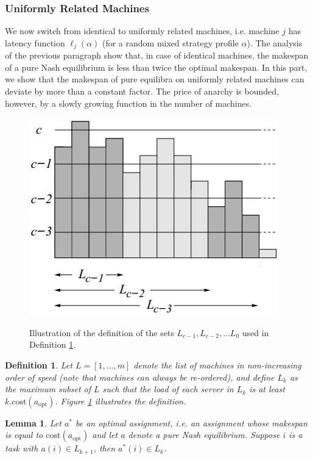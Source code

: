 \documentclass[a4paper,11pt]{article}
\newtheorem{lemma}[theorem]{Lemma}
\newtheorem{definition}[theorem]{Definition}
\newcommand{\cost}{\text{cost}}
\newcommand{\opt}{\text{opt}}
\newcommand{\copt}{\cost(a_{\opt})}
\begin{document}
\subsubsection{Uniformly Related Machines}
We now switch from identical to uniformly related machines, i.e. machine $j$ has latency function $\ell_j(\alpha)$ (for a random mixed strategy profile $\alpha$). The analysis of the previous paragraph show that, in case of identical machines, the makespan of a pure Nash equilibrium is less than twice the optimal makespan. In this part, we show that the makespan of pure equilibra on uniformly related machines can deviate by more than a constant factor. The price of anarchy is bounded, however, by a slowly growing function in the number of machines.


\begin{figure}[t]
  \centering
  \includegraphics[scale=0.5]{lk.jpg}\\
  \caption{Illustration of the definition of the sets $L_{c-1}, L_{c-2},...L_0$ used in Definition \ref{lkdef}.}\label{lk}
\end{figure}

\begin{definition}\cite{4}\label{lkdef}
Let $L = [1,...,m]$ denote the list of machines in non-increasing order of speed (note that machines can always be re-ordered), and define $L_k$ as the maximum subset of $L$ such that the load of each server in $L_k$ is at least $k.\copt$. Figure \ref{lk} illustrates the definition.
\end{definition}

\begin{lemma}\label{lemmalk}
Let $a^*$ be an optimal assignment, i.e. an assignment whose makespan is equal to $\copt$ and let $a$ denote a pure Nash equilibrium. Suppose $i$ is a task with $a(i) \in L_{k+1}$, then $a^*(i) \in L_k$.
\end{lemma}
\end{document}
